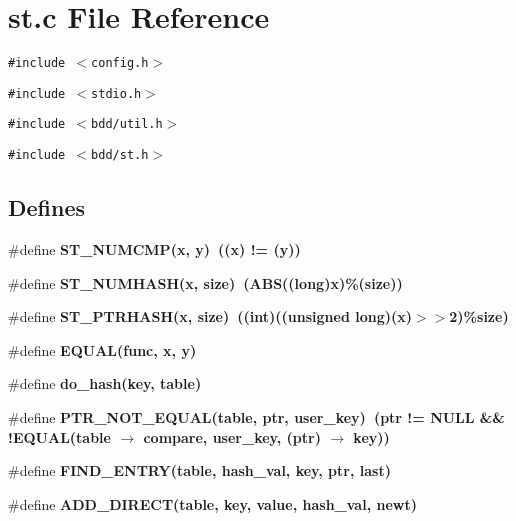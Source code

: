 \section{st.c File Reference}
\label{st_8c}
{\tt \#include $<$config.h$>$}\par
{\tt \#include $<$stdio.h$>$}\par
{\tt \#include $<$bdd/util.h$>$}\par
{\tt \#include $<$bdd/st.h$>$}\par
\subsection*{Defines}
\begin{CompactItemize}
\item 
\#define \bf{ST\_\-NUMCMP}(x, y)~((x) != (y))
\item 
\#define \bf{ST\_\-NUMHASH}(x, \bf{size})~(ABS((long)x)\%(\bf{size}))
\item 
\#define \bf{ST\_\-PTRHASH}(x, \bf{size})~((int)((unsigned long)(x)$>$$>$2)\%\bf{size})
\item 
\#define \bf{EQUAL}(func, x, y)
\item 
\#define \bf{do\_\-hash}(key, table)
\item 
\#define \bf{PTR\_\-NOT\_\-EQUAL}(table, ptr, user\_\-key)~(ptr != NULL \&\& !EQUAL(table $\rightarrow$ compare, user\_\-key, (ptr) $\rightarrow$ key))
\item 
\#define \bf{FIND\_\-ENTRY}(table, hash\_\-val, key, ptr, last)
\item 
\#define \bf{ADD\_\-DIRECT}(table, key, value, hash\_\-val, newt)
\end{CompactItemize}
